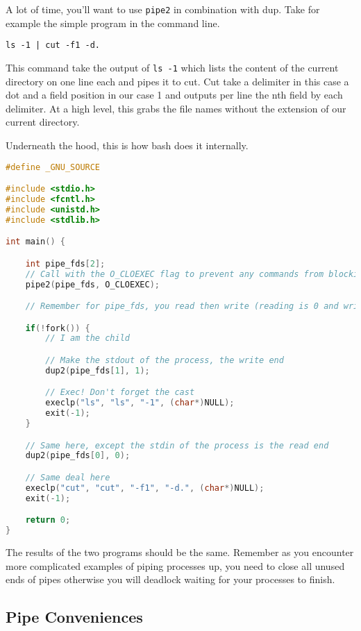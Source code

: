 A lot of time, you'll want to use \texttt{pipe2} in combination with dup. Take for example the simple program in the command line.

\begin{verbatim}
ls -1 | cut -f1 -d.
\end{verbatim}

This command take the output of \texttt{ls -1} which lists the content of the current directory on one line each and pipes it to cut.
Cut take a delimiter in this case a dot and a field position in our case 1 and outputs per line the nth field by each delimiter.
At a high level, this grabs the file names without the extension of our current directory.

Underneath the hood, this is how bash does it internally.


\begin{lstlisting}[language=C]
#define _GNU_SOURCE

#include <stdio.h>
#include <fcntl.h>
#include <unistd.h>
#include <stdlib.h>

int main() {

    int pipe_fds[2];
    // Call with the O_CLOEXEC flag to prevent any commands from blocking
    pipe2(pipe_fds, O_CLOEXEC);

    // Remember for pipe_fds, you read then write (reading is 0 and writing is 1)

    if(!fork()) {
        // I am the child

        // Make the stdout of the process, the write end
        dup2(pipe_fds[1], 1);

        // Exec! Don't forget the cast
        execlp("ls", "ls", "-1", (char*)NULL);
        exit(-1);
    }

    // Same here, except the stdin of the process is the read end
    dup2(pipe_fds[0], 0);

    // Same deal here
    execlp("cut", "cut", "-f1", "-d.", (char*)NULL);
    exit(-1);

    return 0;
}
\end{lstlisting}

The results of the two programs should be the same. Remember as you encounter more complicated examples of piping processes up, you need to close all unused ends of pipes otherwise you will deadlock waiting for your processes to finish.

\subsection{Pipe Conveniences}

